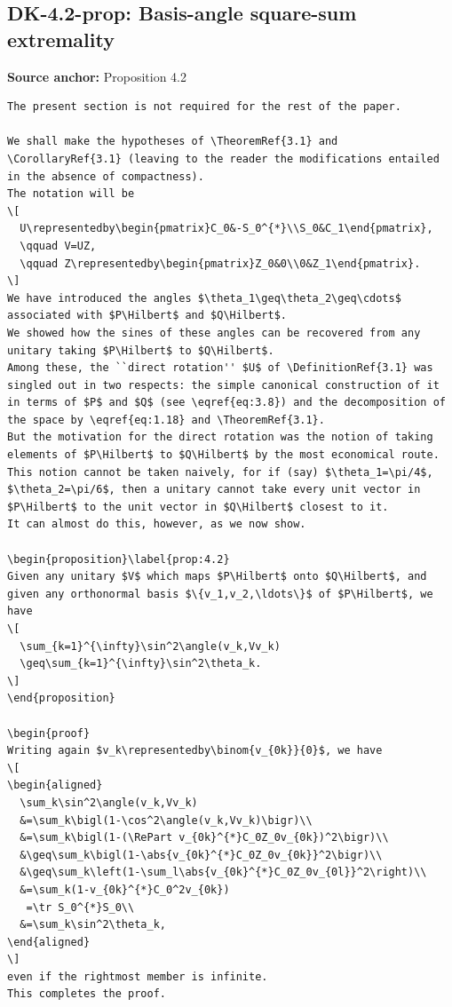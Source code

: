 \subsection*{DK-4.2-prop: Basis-angle square-sum extremality}
\noindent\textbf{Source anchor:} Proposition 4.2\\
\begin{verbatim}
The present section is not required for the rest of the paper.

We shall make the hypotheses of \TheoremRef{3.1} and \CorollaryRef{3.1} (leaving to the reader the modifications entailed in the absence of compactness).
The notation will be
\[
  U\representedby\begin{pmatrix}C_0&-S_0^{*}\\S_0&C_1\end{pmatrix},
  \qquad V=UZ,
  \qquad Z\representedby\begin{pmatrix}Z_0&0\\0&Z_1\end{pmatrix}.
\]
We have introduced the angles $\theta_1\geq\theta_2\geq\cdots$ associated with $P\Hilbert$ and $Q\Hilbert$.
We showed how the sines of these angles can be recovered from any unitary taking $P\Hilbert$ to $Q\Hilbert$.
Among these, the ``direct rotation'' $U$ of \DefinitionRef{3.1} was singled out in two respects: the simple canonical construction of it in terms of $P$ and $Q$ (see \eqref{eq:3.8}) and the decomposition of the space by \eqref{eq:1.18} and \TheoremRef{3.1}.
But the motivation for the direct rotation was the notion of taking elements of $P\Hilbert$ to $Q\Hilbert$ by the most economical route.
This notion cannot be taken naively, for if (say) $\theta_1=\pi/4$, $\theta_2=\pi/6$, then a unitary cannot take every unit vector in $P\Hilbert$ to the unit vector in $Q\Hilbert$ closest to it.
It can almost do this, however, as we now show.

\begin{proposition}\label{prop:4.2}
Given any unitary $V$ which maps $P\Hilbert$ onto $Q\Hilbert$, and given any orthonormal basis $\{v_1,v_2,\ldots\}$ of $P\Hilbert$, we have
\[
  \sum_{k=1}^{\infty}\sin^2\angle(v_k,Vv_k)
  \geq\sum_{k=1}^{\infty}\sin^2\theta_k.
\]
\end{proposition}

\begin{proof}
Writing again $v_k\representedby\binom{v_{0k}}{0}$, we have
\[
\begin{aligned}
  \sum_k\sin^2\angle(v_k,Vv_k)
  &=\sum_k\bigl(1-\cos^2\angle(v_k,Vv_k)\bigr)\\
  &=\sum_k\bigl(1-(\RePart v_{0k}^{*}C_0Z_0v_{0k})^2\bigr)\\
  &\geq\sum_k\bigl(1-\abs{v_{0k}^{*}C_0Z_0v_{0k}}^2\bigr)\\
  &\geq\sum_k\left(1-\sum_l\abs{v_{0k}^{*}C_0Z_0v_{0l}}^2\right)\\
  &=\sum_k(1-v_{0k}^{*}C_0^2v_{0k})
   =\tr S_0^{*}S_0\\
  &=\sum_k\sin^2\theta_k,
\end{aligned}
\]
even if the rightmost member is infinite.
This completes the proof.
\end{verbatim}

